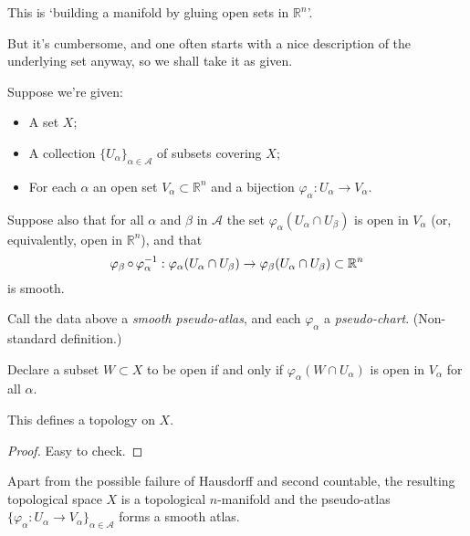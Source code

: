 \documentclass[a4paper,11pt]{article}
\begin{document}

	This is `building a manifold by gluing open sets in $\mathbb{R}^n$'.

	But it's cumbersome, and one often starts with a nice description of the underlying set anyway, so we shall take it as given.

	Suppose we're given:
	\begin{itemize}
		\item A set $X$;
		\item A collection $\{U_\alpha\}_{\alpha\in \mathcal{A}}$ of subsets covering $X$;
		\item For each $\alpha$ an open set $V_\alpha \subset \mathbb{R}^n$ and a bijection $\varphi_\alpha : U_\alpha \to V_\alpha$.
	\end{itemize}
	Suppose also that for all $\alpha$ and $\beta$ in $\mathcal{A}$ the set $\varphi_\alpha(U_\alpha \cap U_\beta)$ is open in $V_\alpha$ (or, equivalently, open in $\mathbb{R}^n$), and that
	\[
		\varphi_\beta \operatorname{\circ} \varphi_\alpha^{-1} : \varphi_\alpha(U_\alpha \cap U_\beta) \to \varphi_\beta (U_\alpha \cap U_\beta) \subset \mathbb{R}^n
	\]
	is smooth.

	\begin{defi}
		Call the data above a \emph{smooth pseudo-atlas}, and each $\varphi_\alpha$ a \emph{pseudo-chart}. (Non-standard definition.)
	\end{defi}

	Declare a subset $W \subset X$ to be open if and only if $\varphi_\alpha(W\cap U_\alpha)$ is open in $V_\alpha$ for all $\alpha$.

	\begin{lem}
		This defines a topology on $X$.
	\end{lem}

	\begin{proof}
		Easy to check.
	\end{proof}

	\begin{prop}
		Apart from the possible failure of Hausdorff and second countable, the resulting topological space $X$ is a topological $n$-manifold and the pseudo-atlas $\{\varphi_\alpha : U_\alpha \to V_\alpha\}_{\alpha\in \mathcal{A}}$ forms a smooth atlas.
	\end{prop}
\end{document}

